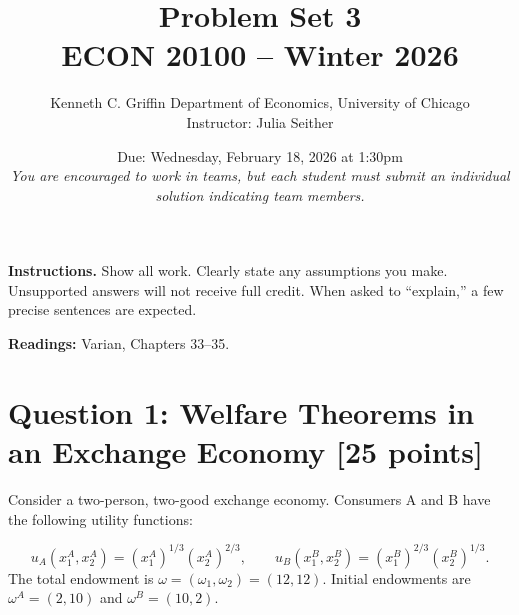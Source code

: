 \documentclass[11pt]{article}
\title{Problem Set 3 \\ ECON 20100 -- Winter 2026}
\author{Kenneth C. Griffin Department of Economics, University of Chicago \\ Instructor: Julia Seither}
\date{
Due: Wednesday, February 18, 2026 at 1:30pm \\ \medskip
\textit{You are encouraged to work in teams, but each student must submit an individual solution indicating team members.}
}
\begin{document}
\maketitle

\medskip

\noindent \textbf{Instructions.} Show all work. Clearly state any assumptions you make. Unsupported answers will not receive full credit. When asked to ``explain,'' a few precise sentences are expected.

\bigskip

\noindent \textbf{Readings:} Varian, Chapters 33--35.

\bigskip

\section*{Question 1: Welfare Theorems in an Exchange Economy [25 points]}

Consider a two-person, two-good exchange economy. Consumers A and B have the following utility functions:

\[
u_A(x_1^A, x_2^A) = (x_1^A)^{1/3}(x_2^A)^{2/3}, 
\qquad
u_B(x_1^B, x_2^B) = (x_1^B)^{2/3}(x_2^B)^{1/3}.
\]
The total endowment is $\omega = (\omega_1, \omega_2) = (12, 12)$.  
Initial endowments are $\omega^A = (2,10)$ and $\omega^B = (10,2)$.
\end{document}
